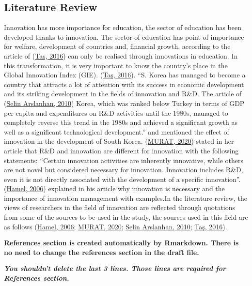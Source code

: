 \documentclass[
  12pt,
]{article}
\begin{document}
\hypertarget{literature-review}{%
\subsection{Literature Review}\label{literature-review}}

Innovation has more importance for education, the sector of education has been developed thanks to innovation. The sector of education has point of importance for welfare, development of countries and, financial growth. according to the article of (\protect\hyperlink{ref-taux15f:2016}{Taş, 2016}) can only be realised through innovations in education. In this transformation, it is very important to know the country's place in the Global Innovation Index (GIE). (\protect\hyperlink{ref-taux15f:2016}{Taş, 2016}).
``S. Korea has managed to become a country that attracts a lot of attention with its success in economic development and its striking development in the fields of innovation and R\&D. The article of (\protect\hyperlink{ref-arslanhan:2010}{Selin Arslanhan, 2010}) Korea, which was ranked below Turkey in terms of GDP per capita and expenditures on R\&D activities until the 1980s, managed to completely reverse this trend in the 1980s and achieved a significant growth as well as a significant technological development.'' and mentioned the effect of innovation in the development of South Korea.
(\protect\hyperlink{ref-murat:2020}{MURAT, 2020}) stated in her article that R\&D and innovation are different for innovation with the following statements: ``Certain innovation activities are inherently innovative, while others are not novel but considered necessary for innovation. Innovation includes R\&D, even it is not directly associated with the development of a specific innovation''.
(\protect\hyperlink{ref-hamel:2006}{Hamel, 2006}) explained in his article why innovation is necessary and the importance of innovation management with examples.In the literature review, the views of researchers in the field of innovation are reflected through quotations from some of the sources to be used in the study, the sources used in this field are as follows (\protect\hyperlink{ref-hamel:2006}{Hamel, 2006}; \protect\hyperlink{ref-murat:2020}{MURAT, 2020}; \protect\hyperlink{ref-arslanhan:2010}{Selin Arslanhan, 2010}; \protect\hyperlink{ref-taux15f:2016}{Taş, 2016}).

\textbf{References section is created automatically by Rmarkdown. There is no need to change the references section in the draft file.}

\textbf{\emph{You shouldn't delete the last 3 lines. Those lines are required for References section.}}
\end{document}
